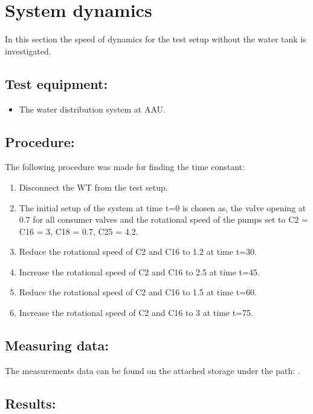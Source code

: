 \section{System dynamics}
\label{sec:pipe_dynamics}

In this section the speed of dynamics for the test setup without the water tank is investigated.

\subsection*{Test equipment:}
\begin{itemize}
\item The water distribution system at AAU.
\end{itemize}

\subsection*{Procedure:}
The following procedure was made for finding the time constant:
\begin{enumerate}
\item Disconnect the WT from the test setup.	
\item The initial setup of the system at time t=0 is chosen as, the valve opening at 0.7 for all consumer valves and the rotational speed of the pumps set to C2 = C16 = 3, C18 = 0.7, C25 = 4.2.
\item Reduce the rotational speed of C2 and C16 to 1.2 at time t=30.
\item Increase the rotational speed of C2 and C16 to 2.5 at time t=45.
\item Reduce the rotational speed of C2 and C16 to 1.5 at time t=60.
\item Increase the rotational speed of C2 and C16 to 3 at time t=75.
\end{enumerate}

\subsection*{Measuring data:}
The measurements data can be found on the attached storage under the path: .

\subsection*{Results:}

